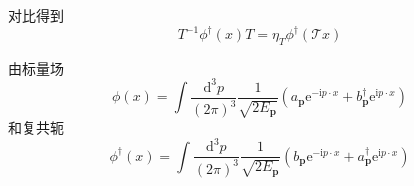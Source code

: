 对比得到
\begin{equation}
    T^{-1}\phi ^{\dagger}\left( x \right) T=\eta _T\phi ^{\dagger}(\mathcal{T} x)
\end{equation}


由标量场
\begin{equation}
    \phi \left( x \right) =\int{\frac{\mathrm{d}^3p}{\left( 2\pi \right) ^3}}\frac{1}{\sqrt{2E_{\mathbf{p}}}}\left( a_{\mathbf{p}}\mathrm{e}^{-\mathrm{i}p\cdot x}+b_{\mathbf{p}}^{\dagger}\mathrm{e}^{\mathrm{i}p\cdot x} \right) 
\end{equation}
和复共轭
\begin{equation}
    \phi ^{\dagger}(x)=\int{\frac{\mathrm{d}^3p}{\left( 2\pi \right) ^3}}\frac{1}{\sqrt{2E_{\mathbf{p}}}}\left( b_{\mathbf{p}}\mathrm{e}^{-\mathrm{i}p\cdot x}+a_{\mathbf{p}}^{\dagger}\mathrm{e}^{\mathrm{i}p\cdot x} \right) 
\end{equation}

